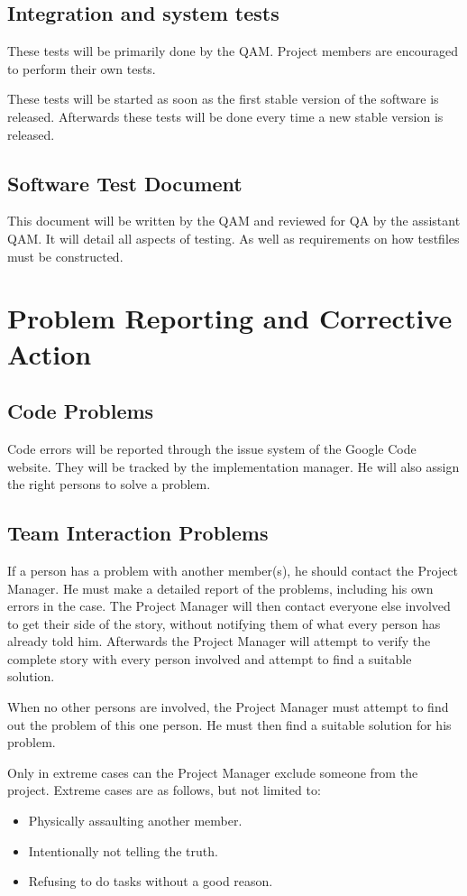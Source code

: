 \documentclass[salesmen, twoside]{../../../templates/latex/2009/softproj}
\begin{document}
\begin{projdoc}
\section{Integration and system tests}
These tests will be primarily done by the QAM. Project members are encouraged to perform their own tests.

These tests will be started as soon as the first stable version of the software is released. Afterwards these tests will be done every time a new stable version is released.

\section{Software Test Document}
This document will be written by the QAM and reviewed for QA by the assistant QAM. It will detail all aspects of testing. As well as requirements on how testfiles must be constructed.


\chapter{Problem Reporting and Corrective Action}
\section{Code Problems}
Code errors will be reported through the issue system of the Google Code website. They will be tracked by the implementation manager. He will also assign the right persons to solve a problem.

\section{Team Interaction Problems}
If a person has a problem with another member(s), he should contact the Project Manager. He must make a detailed report of the problems, including his own errors in the case. The Project Manager will then contact everyone else involved to get their side of the story, without notifying them of what every person has already told him. Afterwards the Project Manager will attempt to verify the complete story with every person involved and attempt to find a suitable solution.

When no other persons are involved, the Project Manager must attempt to find out the problem of this one person. He must then find a suitable solution for his problem.

Only in extreme cases can the Project Manager exclude someone from the project. Extreme cases are as follows, but not limited to:
\begin{itemize}
\item
Physically assaulting another member.
\item
Intentionally not telling the truth.
\item
Refusing to do tasks without a good reason.
\end{itemize}


\end{projdoc}
\end{document}
